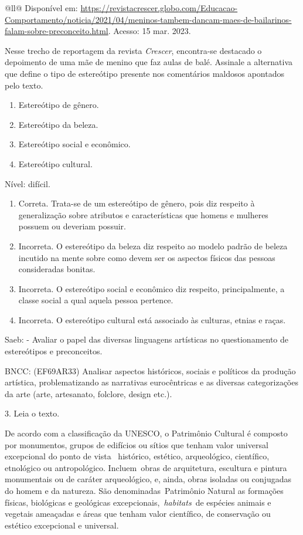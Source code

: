 \begin{itemize}
\begin{itemize}
\begin{escolha}[]{@{}ll@{}}
Disponível em:
\url{https://revistacrescer.globo.com/Educacao-Comportamento/noticia/2021/04/meninos-tambem-dancam-maes-de-bailarinos-falam-sobre-preconceito.html}.
Acesso: 15 mar. 2023.

Nesse trecho de reportagem da revista \emph{Crescer}, encontra-se
destacado o depoimento de uma mãe de menino que faz aulas de balé.
Assinale a alternativa que define o tipo de estereótipo presente nos
comentários maldosos apontados pelo texto.

\begin{enumerate}
\def\labelenumi{\alph{enumi})}
\item
  Estereótipo de gênero.
\item
  Estereótipo da beleza.
\item
  Estereótipo social e econômico.
\item
  Estereótipo cultural.
\end{enumerate}

Nível: difícil.

\begin{enumerate}
\def\labelenumi{\alph{enumi}.}
\item
  Correta. Trata-se de um estereótipo de gênero, pois diz respeito à
  generalização sobre atributos e características que homens e mulheres
  possuem ou deveriam possuir.
\item
  Incorreta. O estereótipo da beleza diz respeito ao modelo padrão de
  beleza incutido na mente sobre como devem ser os aspectos físicos das
  pessoas consideradas bonitas.
\item
  Incorreta. O estereótipo social e econômico diz respeito,
  principalmente, a classe social a qual aquela pessoa pertence.
\item
  Incorreta. O estereótipo cultural está associado às culturas, etnias e
  raças.
\end{enumerate}

Saeb: - Avaliar o papel das diversas linguagens artísticas no
questionamento de estereótipos e preconceitos.

BNCC: (EF69AR33) Analisar aspectos históricos, sociais e políticos da
produção artística, problematizando as narrativas eurocêntricas e as
diversas categorizações da arte (arte, artesanato, folclore, design
etc.).

3. Leia o texto.

De acordo com a classificação da UNESCO, o Patrimônio Cultural é
composto por monumentos, grupos de edifícios ou sítios que tenham valor
universal excepcional do ponto de vista ~histórico, estético,
arqueológico, científico, etnológico ou antropológico. Incluem~obras de
arquitetura, escultura e pintura monumentais ou de caráter arqueológico,
e, ainda, obras isoladas ou conjugadas do homem e da natureza. São
denominadas~Patrimônio Natural as formações físicas, biológicas e
geológicas excepcionais,~\emph{habitats}~de espécies animais e vegetais
ameaçadas e áreas que tenham valor científico, de conservação ou
estético excepcional e universal.


\end{escolha}
\end{itemize}
\end{itemize}
